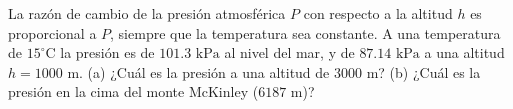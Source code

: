 \item La razón de cambio de la presión atmosférica $P$ con respecto a la altitud $h$ es proporcional a $P$, siempre que la temperatura sea constante. A una temperatura de $15^\circ\text{C}$ la presión es de $101.3 \text{ kPa}$ al nivel del mar, y de $87.14 \text{ kPa}$ a una altitud $h = 1000 \text{ m}$. (a) ¿Cuál es la presión a una altitud de $3000 \text{ m}$? (b) ¿Cuál es la presión en la cima del monte McKinley ($6187 \text{ m}$)?
